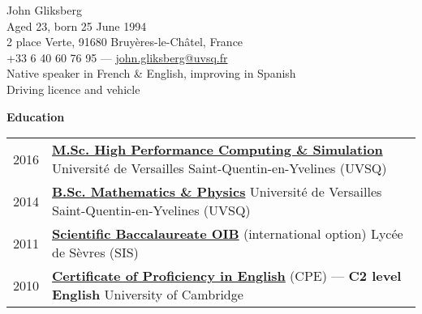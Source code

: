 {\Large John Gliksberg}
\hrulefill\\
\newline
Aged 23, born 25 June 1994\\
2 place Verte, 91680 Bruyères-le-Châtel, France\\[.1cm]
+33 6 40 60 76 95 —
\href{mailto:john.gliksberg@uvsq.fr}
{john.gliksberg\makeatletter @\makeatother uvsq.fr}\\[.1cm]
Native speaker in French \& English, improving in Spanish \\
Driving licence and vehicle

\begin{center}
\end{center}
\vspace{.3cm}

{\large\bf Education}
\hrulefill\\[.3cm]
{
    \setlength{\extrarowheight}{.2cm}
    \begin{tabularx}{\textwidth}{lX}
        2016 &
        \href{http://chps.uvsq.fr}
        {\bf M.Sc. High Performance Computing \& Simulation}
        \newline
        Université de Versailles Saint-Quentin-en-Yvelines (UVSQ) \\
        2014 &
        \href{http://www.uvsq.fr/double-licence-mathematiques-et-physique-343617.kjsp}
        {\bf B.Sc. Mathematics \& Physics}
        \newline
        Université de Versailles Saint-Quentin-en-Yvelines (UVSQ) \\
        2011 &
        \href{http://www.education.gouv.fr/cid20999/l-option-internationale-du-baccalaureat-o.i.b.html}
        {\bf Scientific Baccalaureate OIB} (international option)
        \newline
        Lycée de Sèvres (SIS) \\
        2010 &
        \href{http://www.cambridgeenglish.org/exams/proficiency/}
        {\bf Certificate of Proficiency in English} (CPE)
        — {\bf C2 level English}
        \newline
        University of Cambridge
    \end{tabularx}
}
\vspace{.3cm}

